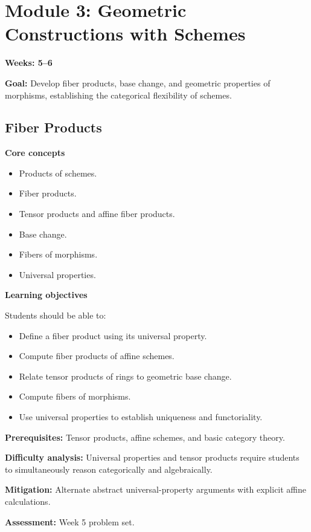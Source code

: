 \documentclass[11pt]{article}
\begin{document}
\section{Module 3: Geometric Constructions with Schemes}

\textbf{Weeks: 5--6}

\textbf{Goal:} Develop fiber products, base change, and geometric properties of morphisms, establishing the categorical flexibility of schemes.

\subsection{Fiber Products}

\textbf{Core concepts}
\begin{itemize}
    \item Products of schemes.
    \item Fiber products.
    \item Tensor products and affine fiber products.
    \item Base change.
    \item Fibers of morphisms.
    \item Universal properties.
\end{itemize}

\textbf{Learning objectives}

Students should be able to:
\begin{itemize}
    \item Define a fiber product using its universal property.
    \item Compute fiber products of affine schemes.
    \item Relate tensor products of rings to geometric base change.
    \item Compute fibers of morphisms.
    \item Use universal properties to establish uniqueness and functoriality.
\end{itemize}

\textbf{Prerequisites:} Tensor products, affine schemes, and basic category theory.

\textbf{Difficulty analysis:} Universal properties and tensor products require students to simultaneously reason categorically and algebraically.

\textbf{Mitigation:} Alternate abstract universal-property arguments with explicit affine calculations.

\textbf{Assessment:} Week 5 problem set.
\end{document}
